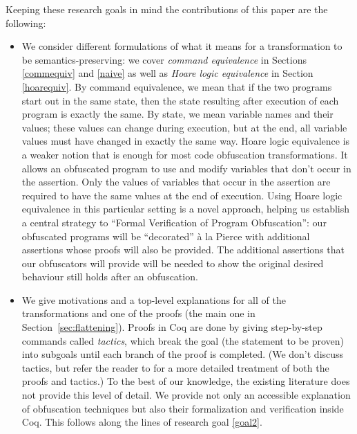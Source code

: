 \documentclass[compsoc,conference,a4paper,10pt,times]{IEEEtran}
\begin{document}
Keeping these research goals in mind the contributions of this paper are the following:
\begin{itemize}
    \item \label{itm:1} We consider different formulations of what it means for a transformation to be semantics-preserving: we cover \emph{command equivalence} in Sections \ref{commequiv} and \ref{naive} as well as \emph{Hoare logic equivalence} in Section \ref{hoarequiv}. By command equivalence, we mean that if the two programs start out in the same state, then the state resulting after execution of each program is exactly the same.  By state, we mean variable names and their values; these values can change during execution, but at the end, all variable values must have changed in exactly the same way.  
    Hoare logic equivalence is a weaker notion that is enough for most code obfuscation transformations. It allows an obfuscated program to use and modify variables that don't occur in the assertion.  Only the values of variables that occur in the assertion are required to have the same values at the end of execution.  Using Hoare logic equivalence in this particular setting is a novel approach, helping us establish a central strategy to ``Formal Verification of Program Obfuscation'': our obfuscated programs will be ``decorated''  \`a la  Pierce \cite{SFV2} with additional assertions whose proofs will also be provided. The additional assertions that our obfuscators will provide will be needed to show the original desired behaviour still holds after an obfuscation.
    
    
    \item We give motivations and a top-level explanations for all of the transformations and one of the proofs (the main one in Section~\ref{sec:flattening}).  Proofs in Coq are done by giving step-by-step commands called \emph{tactics}, which break the goal (the statement to be proven) into subgoals until each branch of the proof is completed.  (We don't discuss tactics, but
    refer the reader to \cite{Weiyun} for a more detailed treatment of both the proofs and tactics.) 
    To the best of our knowledge, the existing literature does not provide this level of detail. We provide not only an accessible explanation of obfuscation techniques but also their formalization and verification inside Coq. This follows along the lines of research goal \ref{goal2}. 
 

\end{itemize}
\end{document}
